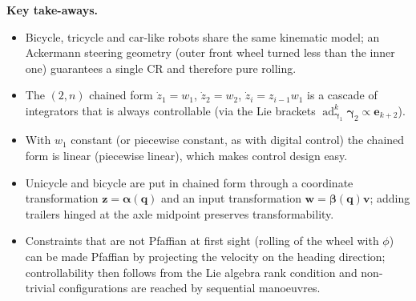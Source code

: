 \documentclass[11pt,a4paper]{article}
\theoremstyle{definition}
\theoremstyle{plain}
\newcommand{\qv}{\bm{q}}
\newcommand{\zv}{\bm{z}}
\newcommand{\wv}{\bm{w}}
\newcommand{\vv}{\bm{v}}
\DeclareMathOperator{\ad}{ad}
\begin{document}
\textbf{Key take-aways.}
\begin{itemize}
 \item Bicycle, tricycle and car-like robots share the same kinematic model; an Ackermann steering geometry (outer front wheel turned less than the inner one) guarantees a single CR and therefore pure rolling.
 \item The $(2,n)$ chained form $\dot z_1=w_1$, $\dot z_2=w_2$, $\dot z_i=z_{i-1}w_1$ is a cascade of integrators that is always controllable (via the Lie brackets $\ad^k_{\bm\gamma_1}\bm\gamma_2\propto\bm e_{k+2}$).
 \item With $w_1$ constant (or piecewise constant, as with digital control) the chained form is linear (piecewise linear), which makes control design easy.
 \item Unicycle and bicycle are put in chained form through a coordinate transformation $\zv=\bm\alpha(\qv)$ and an input transformation $\wv=\bm\beta(\qv)\vv$; adding trailers hinged at the axle midpoint preserves transformability.
 \item Constraints that are not Pfaffian at first sight (rolling of the wheel with $\phi$) can be made Pfaffian by projecting the velocity on the heading direction; controllability then follows from the Lie algebra rank condition and non-trivial configurations are reached by sequential manoeuvres.
\end{itemize}
\end{document}
